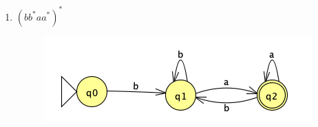 \documentclass[
	12pt, %
]{fphw}
\begin{document}
\begin{enumerate}
\begin{enumerate}[i]
\begin{figure}[H]
    \end{figure}
  \item $(bb^{*}aa^{*})^{*}$
    \begin{figure}[H]
      \centering
      \includegraphics[width=\linewidth]{images/graph4.png}
    \end{figure}
  \end{enumerate}

\end{enumerate}
\end{document}
